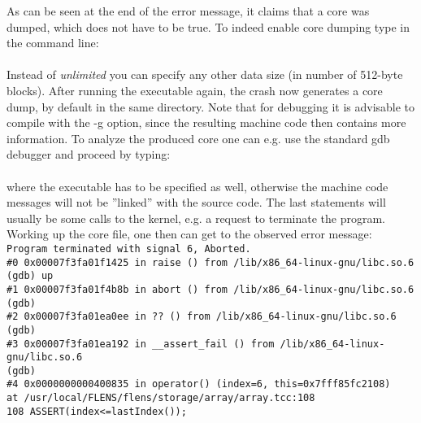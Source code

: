 As can be seen at the end of the error message, it claims that a core was dumped, which does not have to be true. To indeed enable core dumping type in the command line:
\\\\
Instead of \emph{unlimited} you can specify any other data size (in number of 512-byte blocks). After running the executable again, the crash now generates a core dump, by default in the same directory. Note that for debugging it is advisable to compile with the -g option, since the resulting machine code then contains more information. To analyze the produced core one can e.g. use the standard gdb debugger and proceed by typing:
\\\\
where the executable has to be specified as well, otherwise the machine code messages will not be ''linked'' with the source code. The last statements will usually be some calls to the kernel, e.g. a request to terminate the program. Working up the core file, one then can get to the observed error message:\\
\texttt{\footnotesize{Program terminated with signal 6, Aborted.\\
\#0  0x00007f3fa01f1425 in raise () from /lib/x86\_64-linux-gnu/libc.so.6\\
(gdb) up\\
\#1  0x00007f3fa01f4b8b in abort () from /lib/x86\_64-linux-gnu/libc.so.6\\
(gdb) \\
\#2  0x00007f3fa01ea0ee in ?? () from /lib/x86\_64-linux-gnu/libc.so.6\\
(gdb) \\
\#3  0x00007f3fa01ea192 in \_\_assert\_fail () from /lib/x86\_64-linux-gnu/libc.so.6\\
(gdb) \\
\#4  0x0000000000400835 in operator() (index=6, this=0x7fff85fc2108)\\
    at /usr/local/FLENS/flens/storage/array/array.tcc:108\\
108	    ASSERT(index<=lastIndex());}}

